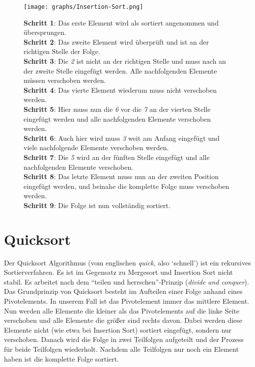 \documentclass[12pt, a4paper, titlepage, hidelinks]{scrreprt}
\begin{document}
\clearpage

\begin{SCfigure}
  \centering
  \texttt{[image: graphs/Insertion-Sort.png]}
  \caption*{\textbf{Schritt 1}: Das erste Element wird als sortiert angenommen und übersprungen. \\[45pt] %
  	\textbf{Schritt 2}: Das zweite Element wird überprüft und ist an der richtigen Stelle der Folge. \\[40pt] %
  	\textbf{Schritt 3}: Die \textit{2} ist nicht an der richtigen Stelle und muss nach an der zweite Stelle eingefügt werden. Alle nachfolgenden Elemente müssen verschoben werden. \\[15pt] %
  	\textbf{Schritt 4}: Das vierte Element wiederum muss nicht verschoben werden. \\[42pt] %
  	\textbf{Schritt 5}: Hier muss nun die \textit{6} vor die \textit{7} an der vierten Stelle eingefügt werden und alle nachfolgenden Elemente verschoben werden. \\[28pt] %
  	\textbf{Schritt 6}: Auch hier wird muss \textit{3} weit am Anfang eingefügt und viele nachfolgende Elemente verschoben werden.\\[32pt] %
  	\textbf{Schritt 7}: Die \textit{5} wird an der fünften Stelle eingefügt und alle nachfolgenden Elemente verschoben. \\[26pt] %
  	\textbf{Schritt 8}: Das letzte Element muss nun an der zweiten Position eingefügt werden, und beinahe die komplette Folge muss verschoben werden. \\[16pt] %
  	\textbf{Schritt 9}: Die Folge ist nun vollständig sortiert.
  }
\end{SCfigure}
\clearpage
\section{Quicksort}
Der Quicksort Algorithmus (vom englischen \textit{quick}, also `schnell') ist ein rekursives Sortierverfahren. Es ist im Gegensatz zu Mergesort und Insertion Sort nicht stabil. Es arbeitet nach dem ``teilen und herrschen''-Prinzip (\textit{divide and conquer}). Das Grundprinzip von Quicksort besteht im Aufteilen einer Folge anhand eines Pivotelements. In unserem Fall ist das Pivotelement immer das mittlere Element. Nun werden alle Elemente die kleiner als das Pivotelements auf die linke Seite verschoben und alle Elemente die größer sind rechts davon. Dabei werden diese Elemente nicht (wie etwa bei Insertion Sort) sortiert eingefügt, sondern nur verschoben. Danach wird die Folge in zwei Teilfolgen aufgeteilt und der Prozess für beide Teilfolgen wiederholt. Nachdem alle Teilfolgen nur noch ein Element haben ist die komplette Folge sortiert.
\end{document}
